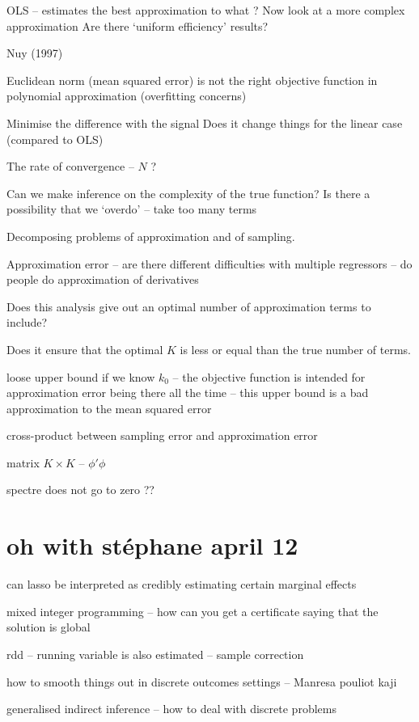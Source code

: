 \documentclass[a4paper,12pt,twoside]{article}
\begin{document}
OLS -- estimates the best approximation to what ?
Now look at a more complex approximation
Are there `uniform efficiency' results?


Nuy (1997)

Euclidean norm (mean squared error) is not the right objective function in polynomial approximation (overfitting concerns)

Minimise the difference with the signal
Does it change things for the linear case (compared to OLS)

The rate of convergence -- $N$ ?

Can we make inference on the complexity of the true function?
Is there a possibility that we `overdo' -- take too many terms

Decomposing problems of approximation and of sampling.

Approximation error -- are there different difficulties with multiple regressors -- do people do approximation of derivatives

Does this analysis give out an optimal number of approximation terms to include?


Does it ensure that the optimal $K$ is less or equal than the true number of terms.

loose upper bound if we know $k_0$ -- the objective function is intended for approximation error being there all the time -- this upper bound is a bad approximation to the mean squared error


cross-product between sampling error and approximation error


matrix $K \times K$ -- $\phi' \phi$

spectre does not go to zero ??



\section*{oh with stéphane april 12}


can lasso be interpreted as credibly estimating certain marginal effects 

mixed integer programming -- how can you get a certificate saying that the solution is global


rdd -- running variable is also estimated -- sample correction


how to smooth things out in discrete outcomes settings -- Manresa pouliot kaji

generalised indirect inference -- how to deal with discrete problems
\end{document}
